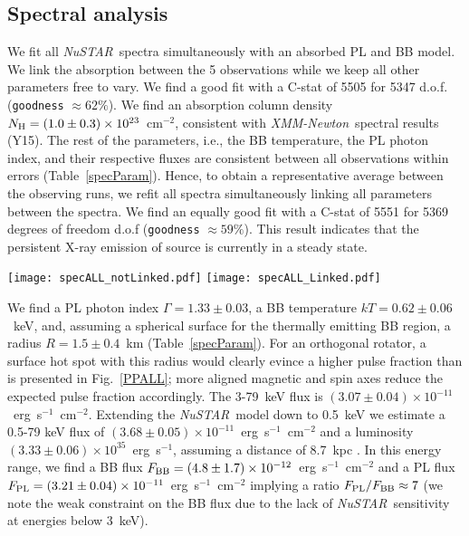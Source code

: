 \documentclass[twocolumn]{aastex6}
\newcommand {\xmm} {\textsl{XMM-Newton}}
\newcommand {\nustar} {\textsl{NuSTAR}}
\begin{document}
\subsection{Spectral analysis}
\label{specana}

We fit all \nustar\ spectra simultaneously with an absorbed PL and BB
model. We link the absorption between the 5 observations while we keep 
all other parameters free to vary. We find a good fit with a C-stat of
5505 for 5347 d.o.f. (\texttt{goodness} $\approx62\%$). We find an
absorption column density $N_{\rm
  H}=(1.0\pm0.3)\times10^{23}$~cm$^{-2}$, consistent with \xmm\  
spectral results (Y15). The rest of the parameters, i.e., the BB
temperature, the PL photon index, and their respective fluxes are 
consistent between all observations within errors
(Table~\ref{specParam}). Hence, to obtain a representative 
average between the observing runs, we refit all spectra simultaneously
linking all parameters between the spectra. We find an equally good
fit with  a C-stat of 5551 for 5369 degrees of freedom d.o.f
(\texttt{goodness} $\approx59\%$). This result indicates that the
persistent X-ray emission of source is currently in a steady state.

\begin{figure*}[t]
\begin{center}
\texttt{[image: specALL\_notLinked.pdf]}
\texttt{[image: specALL\_Linked.pdf]}
\caption{BB+PL best fit model to all \nustar\ observations shown in
  $\nu F\nu$ space. {\sl Left Panels.} Parameters are left free to
  vary between all observations, except for the absorption column
  density. {\sl Right Panels.} All parameters linked between the 5
  observations to provide an ensemble average determination for them. 
  The {\sl upper panels} show the unfolded BB (dashed
  lines) and PL (solid lines) components. Data points were removed for
  clarity. The {\sl lower panels} show the residuals in terms of
  the standard deviation $\sigma$.}
\label{specFit}
\end{center}
\end{figure*}

We find a PL photon index $\Gamma=1.33\pm0.03$, a BB temperature
$kT=0.62\pm0.06$~keV, and, assuming a spherical surface for the
thermally emitting BB region, a radius $R=1.5\pm0.4$~km
(Table~\ref{specParam}). For an orthogonal rotator, 
a surface hot spot with this radius would clearly 
evince a higher pulse fraction than is presented in Fig.~\ref{PPALL}; 
more aligned magnetic and spin axes reduce the expected 
pulse fraction accordingly.  The 3-79~keV flux is
$(3.07\pm0.04)\times10^{-11}$~erg~s$^{-1}$~cm$^{-2}$. Extending the
\nustar\ model down to 0.5~keV we estimate a 0.5-79 keV flux of
$(3.68\pm0.05)\times10^{-11}$~erg~s$^{-1}$~cm$^{-2}$ and a luminosity
$(3.33\pm0.06)\times10^{35}$~erg~s$^{-1}$, assuming a distance of
8.7~kpc \citep{bibby08MNRAS:1806}. In this energy range, we find a BB
flux $F_{\rm BB}=(4.8\pm1.7)\times10^{-12}$~erg~s$^{-1}$~cm$^{-2}$ and
a PL flux $F_{\rm PL}=(3.21\pm0.04)\times10^{-11}$~erg~s$^{-1}$~cm$^{-2}$
implying a ratio $F_{\rm PL}/F_{\rm BB}\approx7$ (we note the weak 
constraint on the BB flux due to the lack of \nustar\ sensitivity at
energies below 3~keV).
\end{document}
